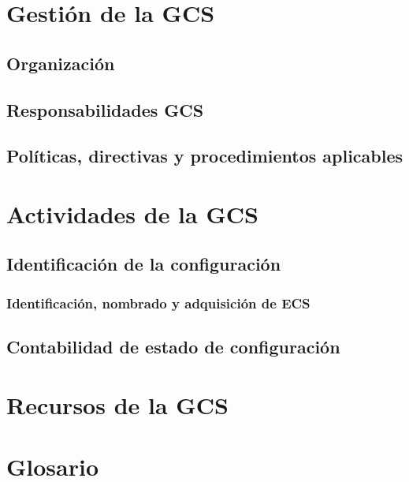 \documentclass[11pt, a4paper, twoside, titlepage]{article}
\begin{document}
	\section{Gestión de la GCS}%
		\subsection{Organización}
		\subsection{Responsabilidades GCS}
		\subsection{Políticas, directivas y procedimientos aplicables}
	\section{Actividades de la GCS}
		\subsection{Identificación de la configuración}%
			\subsubsection{Identificación, nombrado y adquisición de \gls{ECS}}
		\subsection{Contabilidad de estado de configuración}%
	\section{Recursos de la GCS}%
	\section{Glosario}
		\printglossaries

\end{document}
